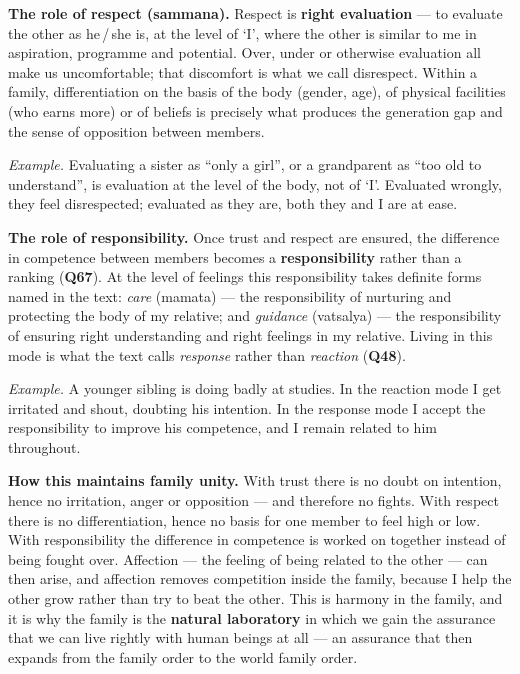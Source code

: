 \textbf{The role of respect (sammana).} Respect is \textbf{right
evaluation} --- to evaluate the other as he\,/\,she is, at the level of `I',
where the other is similar to me in aspiration, programme and potential. Over,
under or otherwise evaluation all make us uncomfortable; that discomfort is
what we call disrespect. Within a family, differentiation on the basis of the
body (gender, age), of physical facilities (who earns more) or of beliefs is
precisely what produces the generation gap and the sense of opposition between
members.

\emph{Example.} Evaluating a sister as ``only a girl'', or a grandparent as
``too old to understand'', is evaluation at the level of the body, not of `I'.
Evaluated wrongly, they feel disrespected; evaluated as they are, both they
and I are at ease.

\textbf{The role of responsibility.} Once trust and respect are ensured, the
difference in competence between members becomes a \textbf{responsibility}
rather than a ranking (\textbf{Q67}). At the level of feelings this
responsibility takes definite forms named in the text: \emph{care} (mamata)
--- the responsibility of nurturing and protecting the body of my relative;
and \emph{guidance} (vatsalya) --- the responsibility of ensuring right
understanding and right feelings in my relative. Living in this mode is what
the text calls \emph{response} rather than \emph{reaction} (\textbf{Q48}).

\emph{Example.} A younger sibling is doing badly at studies. In the reaction
mode I get irritated and shout, doubting his intention. In the response mode I
accept the responsibility to improve his competence, and I remain related to
him throughout.

\textbf{How this maintains family unity.} With trust there is no doubt on
intention, hence no irritation, anger or opposition --- and therefore no
fights. With respect there is no differentiation, hence no basis for one
member to feel high or low. With responsibility the difference in competence
is worked on together instead of being fought over. Affection --- the feeling
of being related to the other --- can then arise, and affection removes
competition inside the family, because I help the other grow rather than try
to beat the other. This is harmony in the family, and it is why the family is
the \textbf{natural laboratory} in which we gain the assurance that we can
live rightly with human beings at all --- an assurance that then expands from
the family order to the world family order.


